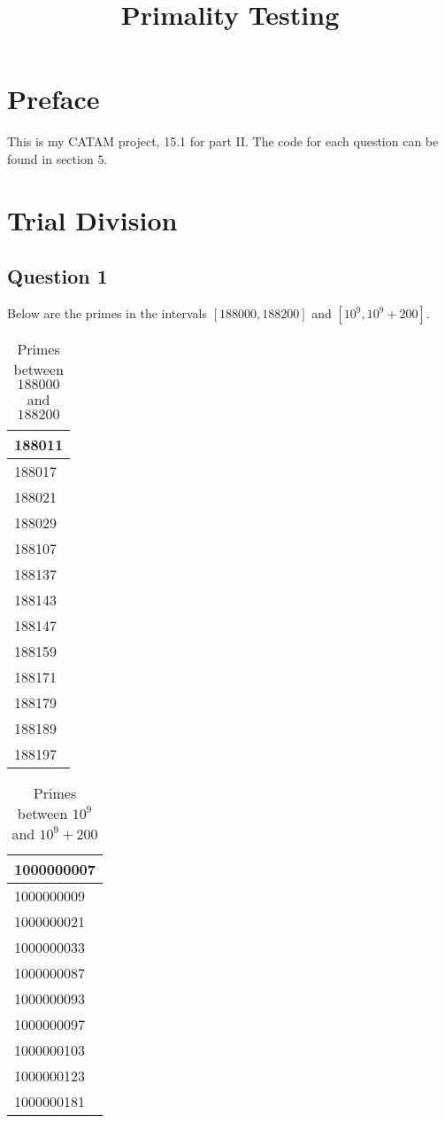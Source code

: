 \documentclass{article}
\begin{document}
\title{Primality Testing}
\maketitle
\tableofcontents
\newpage
\section*{Preface}
This is my CATAM project, 15.1 for part II. The code for each question can be found in section $5$.
\newpage
\section{Trial Division}
\subsection{Question 1}
Below are the primes in the intervals $[188000,188200]$ and $[10^9,10^9+200]$. 
\begin{table}[hp]
\begin{center}
\begin{tabular}{|l|}
\hline
188011 \\ \hline
188017 \\ \hline
188021 \\ \hline
188029 \\ \hline
188107 \\ \hline
188137 \\ \hline
188143 \\ \hline
188147 \\ \hline
188159 \\ \hline
188171 \\ \hline
188179 \\ \hline
188189 \\ \hline
188197 \\ \hline
\end{tabular}
\end{center}
\caption{Primes between $188000$ and $188200$}
\end{table}
\begin{table}[hp]
\begin{center}
\begin{tabular}{|l|}
\hline
1000000007 \\ \hline
1000000009 \\ \hline
1000000021 \\ \hline
1000000033 \\ \hline
1000000087 \\ \hline
1000000093 \\ \hline
1000000097 \\ \hline
1000000103 \\ \hline
1000000123 \\ \hline
1000000181 \\ \hline
\end{tabular}
\end{center}
\caption{Primes between $10^9$ and $10^9+200$}
\end{table}
\end{document}

